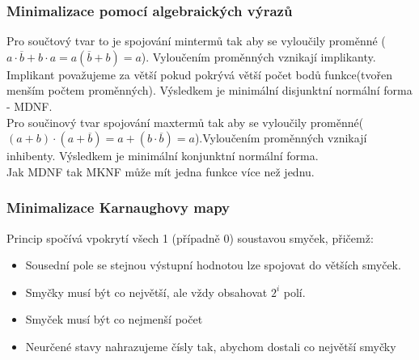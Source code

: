 \subsubsection{Minimalizace pomocí algebraických výrazů}
Pro součtový tvar to je spojování mintermů tak aby se vyloučily proměnné (\(a \cdot \overline{b} + b \cdot a = a(\overline{b} + b) = a\)). Vyloučením proměnných vznikají implikanty. Implikant považujeme za větší pokud pokrývá větší počet bodů funkce(tvořen menším počtem proměnných). Výsledkem je minimální disjunktní normální forma - MDNF.\\
Pro součinový tvar spojování maxtermů tak aby se vyloučily proměnné(\((a+b)\cdot(a+\overline{b}) = a + (b \cdot \overline{b}) = a\)).Vyloučením proměnných vznikají inhibenty. Výsledkem je minimální konjunktní normální forma. \\
Jak MDNF tak MKNF může mít jedna funkce více než jednu.

\subsubsection{Minimalizace Karnaughovy mapy}
Princip spočívá vpokrytí všech 1 (případně 0) soustavou smyček, přičemž:
\begin{itemize}
    \item Sousední pole se stejnou výstupní hodnotou lze spojovat do větších smyček.
    \item Smyčky musí být co největší, ale vždy obsahovat \(2^i\) polí.
    \item Smyček musí být co nejmenší počet
    \item Neurčené stavy nahrazujeme čísly tak, abychom dostali co největší smyčky
\end{itemize}


